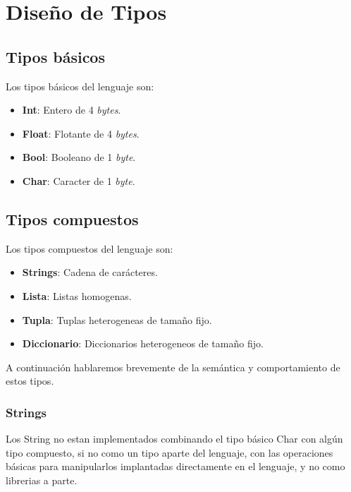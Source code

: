 \documentclass[12pt, spanish]{report}
\begin{document}
\section{Dise\~no de Tipos}
\label{sec:tipos}

\subsection{Tipos b\'asicos}
\label{sec:tiposbasicos}

Los tipos b\'asicos del lenguaje son:

\begin{itemize}
\item \textbf{Int}: Entero de 4 \emph{bytes}.
\item \textbf{Float}: Flotante de 4 \emph{bytes}.
\item \textbf{Bool}: Booleano de 1 \emph{byte}.
\item \textbf{Char}: Caracter de 1 \emph{byte}.
\end{itemize}

\subsection{Tipos compuestos}
\label{sec:tiposcompuestos}

Los tipos compuestos del lenguaje son:

\begin{itemize}
\item \textbf{Strings}: Cadena de car\'acteres.
\item \textbf{Lista}: Listas homogenas.
\item \textbf{Tupla}: Tuplas heterogeneas de tama\~no fijo.
\item \textbf{Diccionario}: Diccionarios heterogeneos de tama\~no fijo.
\end{itemize}

A continuaci\'on hablaremos brevemente de la sem\'antica y
comportamiento de estos tipos.

\subsubsection{Strings}
\label{sec:strings}
Los String no estan implementados combinando el tipo b\'asico Char
con alg\'un tipo compuesto, si no como un tipo aparte del lenguaje,
con las operaciones b\'asicas para manipularlos implantadas directamente
en el lenguaje, y no como librerias a parte.
\end{document}
